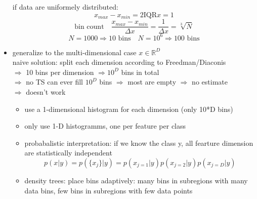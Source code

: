 \documentclass[11pt]{article}
\begin{document}
\begin{itemize}
             if data are uniformely distributed:
             \begin{equation*}
               x_{max}-x_{min} = 2 \text{IQR}{x} = 1
             \end{equation*}
             \begin{equation*}
               \text{bin count} \quad \frac{x_{max}-x_{min}}{\Delta x} = \frac{1}{\Delta x} = \sqrt[3]{N}
             \end{equation*}
             \begin{equation*}
               N = 1000 \Rightarrow 10 \text{ bins} \quad N=10^6 \Rightarrow 100 \text{ bins}
             \end{equation*}
             \item generalize to the multi-dimensional case $x \in \mathbb{R}^D$ \\
             naive solution: split each dimension according to Freedman/Diaconis \\
             $\Rightarrow$ 10 bins per dimension $\Rightarrow 10^D$ bins in total \\
             $\Rightarrow$ no TS can ever fill $10^D$ bins $\Rightarrow$ most are empty $\Rightarrow$ no estimate \\
             $\Rightarrow$ doesn't work

             \begin{itemize}
               \item use a 1-dimensional histogram for each dimension (only 10*D bins)
               \item only use 1-D histogramms, one per feature per class
               \item probabalistic interpretation: if we know the class y, all fearture dimension
               are statistically independent
               \begin{equation*}
                 p(x|y)=p(\{ x_j\}|y)=p(x_{j=1}|y)p(x_{j=2}|y)p(x_{j=D}|y)
               \end{equation*}
               \item density trees: place bins adaptively: many bins in subregions with many data bins,
               few bins in subregions with few data points
             \end{itemize}

\end{itemize}
\end{document}
